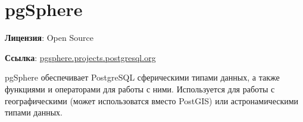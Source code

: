 \section{pgSphere}
\textbf{Лицензия}: Open Source

\textbf{Ссылка}: \href{http://pgsphere.projects.postgresql.org/}{pgsphere.projects.postgresql.org}

pgSphere обеспечивает PostgreSQL сферическими типами данных, а также функциями и операторами для работы с ними. 
Используется для работы с географическими (может использоватся вместо PostGIS) или астронамическими типами данных.